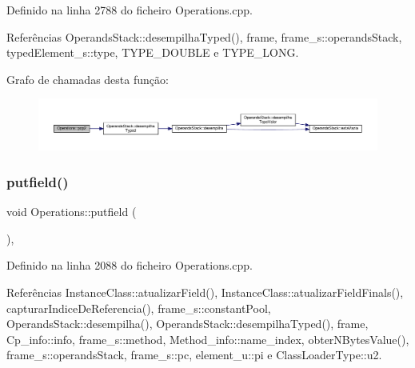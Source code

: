 Definido na linha 2788 do ficheiro Operations.\+cpp.



Referências Operands\+Stack\+::desempilha\+Typed(), frame, frame\+\_\+s\+::operands\+Stack, typed\+Element\+\_\+s\+::type, T\+Y\+P\+E\+\_\+\+D\+O\+U\+B\+LE e T\+Y\+P\+E\+\_\+\+L\+O\+NG.

Grafo de chamadas desta função\+:\nopagebreak
\begin{figure}[H]
\begin{center}
\leavevmode
\includegraphics[width=350pt]{classOperations_a54e578f7f27df39f8c516ec93195e219_cgraph}
\end{center}
\end{figure}
\mbox{\label{classOperations_a56385f246d3d4d5c5674c988a1f0e658}} 
\subsubsection{\texorpdfstring{putfield()}{putfield()}}
{\footnotesize\ttfamily void Operations\+::putfield (\begin{DoxyParamCaption}{ }\end{DoxyParamCaption})\hspace{0.3cm}{\ttfamily [static]}, {\ttfamily [private]}}



Definido na linha 2088 do ficheiro Operations.\+cpp.



Referências Instance\+Class\+::atualizar\+Field(), Instance\+Class\+::atualizar\+Field\+Finals(), capturar\+Indice\+De\+Referencia(), frame\+\_\+s\+::constant\+Pool, Operands\+Stack\+::desempilha(), Operands\+Stack\+::desempilha\+Typed(), frame, Cp\+\_\+info\+::info, frame\+\_\+s\+::method, Method\+\_\+info\+::name\+\_\+index, obter\+N\+Bytes\+Value(), frame\+\_\+s\+::operands\+Stack, frame\+\_\+s\+::pc, element\+\_\+u\+::pi e Class\+Loader\+Type\+::u2.

